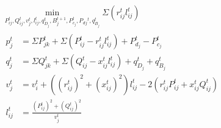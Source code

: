 \begin{gather}
    \min_{P_{ij}^t, Q_{ij}^t, v_{j}^t, l_{ij}^t, q_{D_j}^t, B_{j}^{t+1},
	 P_{c_j}^t, P_d{_j}^t, q_{B_j}^t} \Sigma (r_{ij}^tl_{ij}^t) \\
	\begin{align}
		{p_j^t} & = {\Sigma P_{jk}^t + \Sigma (P_{ij}^t - r_{ij}^tl_{ij}^t) + P_{d_j}^t - P_{c_j}^t} && \\
		{q_j^t} & = {\Sigma Q_{jk}^t + \Sigma (Q_{ij}^t - x_{ij}^tl_{ij}^t) + q_{D_j}^t + q_{B_j}^t} && \\
		{v_j^t} & = {v_{i}^t +  ((r_{ij}^{t})^2 + (x_{ij}^{t})^2)l_{ij}^t - 2(r_{ij}^tP_{ij}^t + x_{ij}^tQ_{ij}^t)} && \\
		{l_{ij}^t} & = {\frac{(P_{ij}^{t})^2 + (Q_{ij}^{t})^2}{v_j^t}} &&
	\end{align}
\end{gather}
